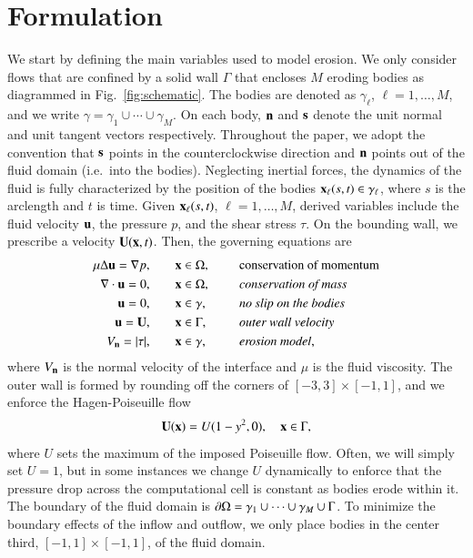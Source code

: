 \documentclass[preprint, 10pt]{elsarticle}
\begin{document}
\section{Formulation}
\label{s:formulation}
We start by defining the main variables used to model erosion.  We only
consider flows that are confined by a solid wall $\Gamma$ that encloses
$M$ eroding bodies as diagrammed in Fig.~\ref{fig:schematic}.  The bodies are denoted as $\gamma_\ell$, $\ell=1,\ldots,M$, and we write $\gamma = \gamma_1 \cup \cdots \cup \gamma_M$.
On each body, $\nn$ and $\ss$ denote the unit normal and unit tangent vectors respectively. Throughout the paper, we adopt the convention that $\ss$ points in the counterclockwise direction and $\nn$ points out of the fluid domain (i.e.~into the bodies). Neglecting inertial forces, the dynamics of the fluid is
fully characterized by the position of the bodies $\xx_\ell(s,t) \in
\gamma_\ell$, where $s$ is the arclength and $t$ is time.  Given
$\xx_\ell(s,t)$, $\ell=1,\ldots,M$, derived variables include the fluid
velocity $\uu$, the pressure $p$, and the shear stress $\tau$.   On the
bounding wall, we prescribe a velocity $\UU(\xx,t)$.  Then, the
governing equations are
\begin{equation}
\label{eqn:erosionModel}
\begin{split}
  \mu \Delta \uu = \grad p, &\hspace{20pt} \xx \in \Omega, \gap &&\mbox{conservation
of momentum}\\
\grad \cdot \uu = 0, &\hspace{20pt} \xx \in \Omega, \gap
&&\mbox{\em conservation of mass} \\
\uu = 0, &\hspace{20pt} \xx \in \gamma, \gap &&\mbox{\em no slip on the
bodies} \\
\uu = \UU, &\hspace{20pt} \xx \in \Gamma, \gap &&\mbox{\em outer wall
velocity} \\
\Vn = \abs{\tau}, &\hspace{20pt} \xx \in \gamma,
&&\mbox{\em erosion model},
\end{split}
\end{equation}
where $\Vn$ is the normal velocity of the interface and $\mu$ is the
fluid viscosity.  The outer wall is formed by rounding off the corners
of $[-3,3] \times [-1,1]$, and we enforce the Hagen-Poiseuille flow
\begin{align*}
  \UU(\xx) = \umax (1-y^2,0), \quad \xx \in \Gamma,
\end{align*}
where $U$ sets the maximum of the imposed Poiseuille flow. Often, we
will simply set $U=1$, but in some instances we change $U$ dynamically
to enforce that the pressure drop across the computational cell is
constant as bodies erode within it.  The boundary of the fluid domain is
$\bd\Omega = \gamma_1 \cup \cdots \cup \gamma_M \cup \Gamma$.  To
minimize the boundary effects of the inflow and outflow, we only place
bodies in the center third, $[-1,1] \times [-1,1]$, of the fluid domain.
\end{document}
